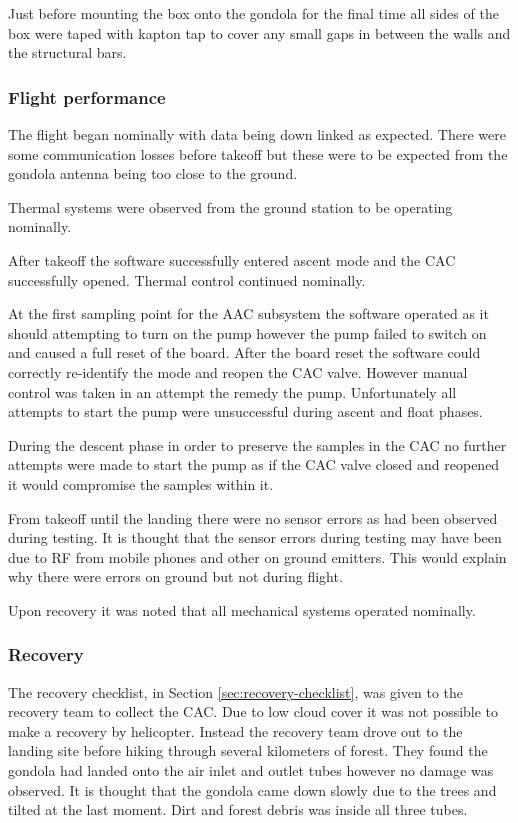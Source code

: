 Just before mounting the box onto the gondola for the final time all sides of the box were taped with kapton tap to cover any small gaps in between the walls and the structural bars.

\subsubsection{Flight performance}
The flight began nominally with data being down linked as expected. There were some communication losses before takeoff but these were to be expected from the gondola antenna being too close to the ground.

Thermal systems were observed from the ground station to be operating nominally.

After takeoff the software successfully entered ascent mode and the CAC successfully opened. Thermal control continued nominally.

At the first sampling point for the AAC subsystem the software operated as it should attempting to turn on the pump however the pump failed to switch on and caused a full reset of the board. After the board reset the software could correctly re-identify the mode and reopen the CAC valve. However manual control was taken in an attempt the remedy the pump. Unfortunately all attempts to start the pump were unsuccessful during ascent and float phases.

During the descent phase in order to preserve the samples in the CAC no further attempts were made to start the pump as if the CAC valve closed and reopened it would compromise the samples within it.

From takeoff until the landing there were no sensor errors as had been observed during testing. It is thought that the sensor errors during testing may have been due to RF from mobile phones and other on ground emitters. This would explain why there were errors on ground but not during flight.

Upon recovery it was noted that all mechanical systems operated nominally.

\subsubsection{Recovery}
The recovery checklist, in Section \ref{sec:recovery-checklist}, was given to the recovery team to collect the CAC. Due to low cloud cover it was not possible to make a recovery by helicopter. Instead the recovery team drove out to the landing site before hiking through several kilometers of forest. They found the gondola had landed onto the air inlet and outlet tubes however no damage was observed. It is thought that the gondola came down slowly due to the trees and tilted at the last moment. Dirt and forest debris was inside all three tubes. 

